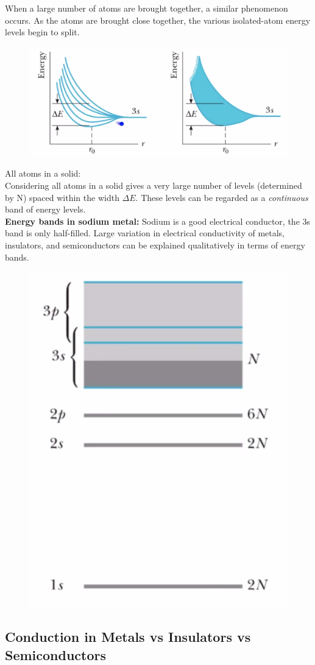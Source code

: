 \documentclass[class=article,crop=false]{standalone}
\begin{document}
When a large number of atoms are brought together, a similar phenomenon occurs. As the atoms are brought close together, the various isolated-atom energy levels begin to split.

\begin{figure}[h!]
	\centering
	\includegraphics[width=.8\linewidth]{./Images/crop.png}
	\caption{}
\end{figure}

All atoms in a solid:\\
Considering all atoms in a solid gives a very large number of levels (determined by N) spaced within the width $\Delta E$. These levels can be regarded as a \emph{continuous} band of energy levels.\\

\textbf{Energy bands in sodium metal:}
Sodium is a good electrical conductor, the 3s band is only half-filled. Large variation in electrical conductivity of metals, insulators, and semiconductors can be explained qualitatively in terms of energy bands.

\begin{figure}[h!]
	\centering
	\includegraphics[width=.4\linewidth]{./Images/bands.png}
	\caption{}
\end{figure}

\subsection{Conduction in Metals vs Insulators vs Semiconductors}
\end{document}
